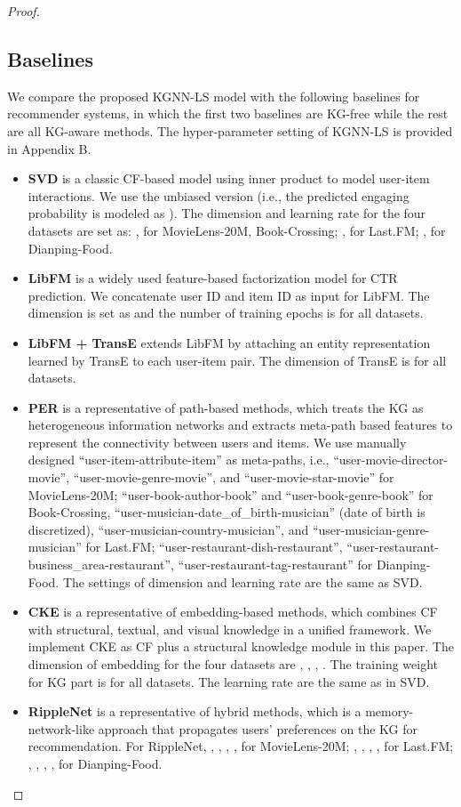 \documentclass[sigconf]{acmart}
\begin{document}
\begin{proof}
	\subsection{Baselines}
		We compare the proposed KGNN-LS model with the following baselines for recommender systems, in which the first two baselines are KG-free while the rest are all KG-aware methods.
		The hyper-parameter setting of KGNN-LS is provided in Appendix B.
		\begin{itemize}
			\item
				\textbf{SVD} \cite{koren2008factorization} is a classic CF-based model using inner product to model user-item interactions.
				We use the unbiased version (i.e., the predicted engaging probability is modeled as ).
				The dimension and learning rate for the four datasets are set as: ,  for MovieLens-20M, Book-Crossing; ,  for Last.FM; ,  for Dianping-Food.
			\item
				\textbf{LibFM} \cite{rendle2012factorization} is a widely used feature-based factorization model for CTR prediction.
				We concatenate user ID and item ID as input for LibFM.
				The dimension is set as  and the number of training epochs is  for all datasets.
			\item
				\textbf{LibFM + TransE} extends LibFM by attaching an entity representation learned by TransE \cite{bordes2013translating} to each user-item pair.
				The dimension of TransE is  for all datasets.
			\item
				\textbf{PER} \cite{yu2014personalized} is a representative of path-based methods, which treats the KG as heterogeneous information networks and extracts meta-path based features to represent the connectivity between users and items.
				We use manually designed ``user-item-attribute-item'' as meta-paths, i.e., ``user-movie-director-movie'', ``user-movie-genre-movie'', and ``user-movie-star-movie'' for MovieLens-20M; ``user-book-author-book'' and ``user-book-genre-book'' for Book-Crossing, ``user-musician-date\_of\_birth-musician'' (date of birth is discretized), ``user-musician-country-musician'', and ``user-musician-genre-musician'' for Last.FM; ``user-restaurant-dish-restaurant'', ``user-restaurant-business\_area-restaurant'', ``user-restaurant-tag-restaurant'' for Dianping-Food.
				The settings of dimension and learning rate are the same as SVD.
			\item
				\textbf{CKE} \cite{zhang2016collaborative} is a representative of embedding-based methods, which combines CF with structural, textual, and visual knowledge in a unified framework.
				We implement CKE as CF plus a structural knowledge module in this paper.
				The dimension of embedding for the four datasets are , , , .
				The training weight for KG part is  for all datasets.
				The learning rate are the same as in SVD.
			\item
				\textbf{RippleNet} \cite{wang2018ripple} is a representative of hybrid methods, which is a memory-network-like approach that propagates users' preferences on the KG for recommendation.
				For RippleNet, , , , ,  for MovieLens-20M; , , , ,  for Last.FM; , , , ,  for Dianping-Food.
		\end{itemize}
			

\end{proof}
\end{document}
